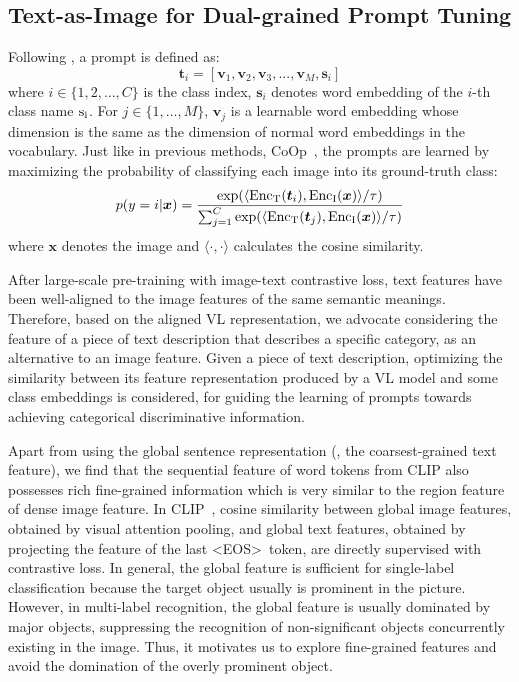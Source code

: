 \documentclass[10pt,twocolumn,letterpaper]{article}
\begin{document}
\subsection{Text-as-Image for Dual-grained Prompt Tuning}
\label{methods2}


Following \cite{coop}, a prompt is defined as:
\begin{equation}
\boldsymbol t_i = [\boldsymbol v_1, \boldsymbol v_2, \boldsymbol v_3, ..., \boldsymbol v_M, \boldsymbol s_i]
\label{eq:0}
\end{equation}
where $i\in\{1, 2, ...,  C\} $ is the class index, $\boldsymbol s_i$ denotes word embedding of the $i$-th class name $\rm s_i$. For $j \in\{1, \ldots, M\}$, $\boldsymbol v_j$ is a learnable word embedding whose dimension is the same as the dimension of normal word embeddings in the vocabulary. 
Just like in previous methods, \eg CoOp~\cite{coop}, the prompts are learned by maximizing the probability of classifying each image into its ground-truth class:
\begin{equation}
  p(y = i| \boldsymbol x) =   \frac{\exp(\langle {\rm Enc_T}(\boldsymbol t_i),{\rm Enc_I}(\boldsymbol x)\rangle /\tau)}{{\textstyle \sum_{j=1}^{C}}\exp(\langle{\rm Enc_T}(\boldsymbol t_j), {\rm Enc_I}(\boldsymbol x)\rangle /\tau)}
  \label{eq:1}
\end{equation}
\noindent where $ \boldsymbol x $ denotes the image and $\langle \cdot, \cdot \rangle$ calculates the cosine similarity.

After large-scale pre-training with image-text contrastive loss, text features have been well-aligned to the image features of the same semantic meanings.
Therefore, based on the aligned VL representation, we advocate considering the feature of a piece of text description that describes a specific category, as an alternative to an image feature.
Given a piece of text description, optimizing the similarity between its feature representation produced by a VL model and some class embeddings is considered, for guiding the learning of prompts towards achieving categorical discriminative information.

Apart from using the global sentence representation (\ie, the coarsest-grained text feature), we find that the sequential feature of word tokens from CLIP also possesses rich fine-grained information which is very similar to the region feature of dense image feature. In CLIP~\cite{clip}, cosine similarity between global image features, obtained by visual attention pooling, and global text features, obtained by projecting the feature of the last \textless EOS\textgreater~token, are directly supervised with contrastive loss. 
In general, the global feature is sufficient for single-label classification because the target object usually is prominent in the picture. However, in multi-label recognition, the global feature is usually dominated by major objects, suppressing the recognition of non-significant objects concurrently existing in the image.
Thus, it motivates us to explore fine-grained features and avoid the domination of the overly prominent object.
\end{document}
